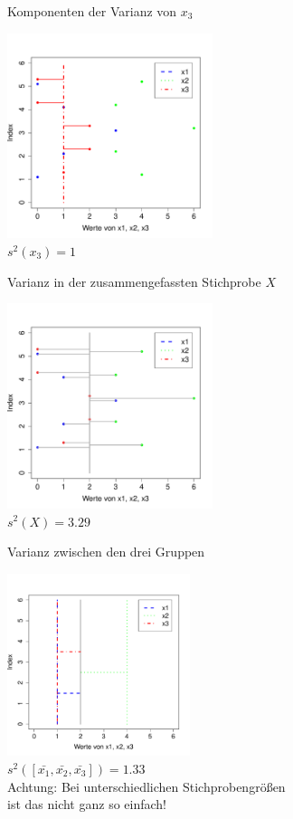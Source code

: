 \begin{frame}
  {Komponenten der Varianz von $x_3$}
  
  \begin{center}
    \includegraphics[width=0.45\textwidth]{graphics/anova_var_x3}\\
    $s^2(x_3)=1$
  \end{center}
\end{frame}

\begin{frame}
  {Varianz in der zusammengefassten Stichprobe $X$}
  
  \begin{center}
    \includegraphics[width=0.45\textwidth]{graphics/anova_var_total}\\
    $s^2(X)=3.29$
  \end{center}
\end{frame}

\begin{frame}
  {Varianz zwischen den drei Gruppen}
  
  \begin{center}
    \includegraphics[width=0.40\textwidth]{graphics/anova_var_between}\\
    $s^2([\bar{x_1}, \bar{x_2}, \bar{x_3}])=1.33$\\
    \vspace{0.5cm}
    Achtung: Bei unterschiedlichen Stichprobengrößen\\
    ist das nicht ganz so einfach!
  \end{center}
\end{frame}


